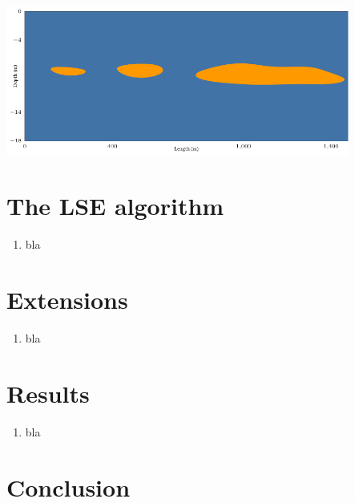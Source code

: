 \documentclass[10pt]{beamer}
\begin{document}
\begin{frame}
\begin{center}
\vspace{0.2in}
\hspace{-2em}\includegraphics[width=4.45in]{figures/limno_bgape_cl}
\end{center}
\end{frame}

\section{The LSE algorithm}

\begin{frame}
\begin{enumerate}
\item bla
\end{enumerate}
\end{frame}

\section{Extensions}

\begin{frame}
\begin{enumerate}
\item bla
\end{enumerate}
\end{frame}

\section{Results}

\begin{frame}
\begin{enumerate}
\item bla
\end{enumerate}
\end{frame}

\section*{Conclusion}
\end{document}
